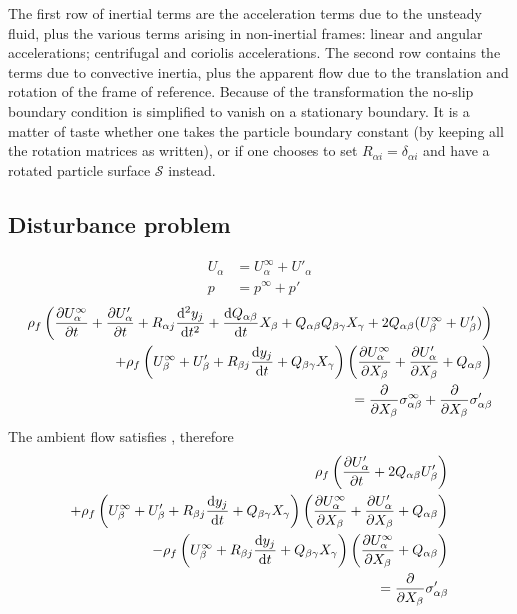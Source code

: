 \documentclass[thesis.tex]{subfiles}
\begin{document}
The first row of inertial terms are the acceleration terms due to the unsteady fluid, plus the various terms arising in non-inertial frames: linear and angular accelerations; centrifugal and coriolis accelerations. The second row contains the terms due to convective inertia, plus the apparent flow due to the translation and rotation of the frame of reference. Because of the transformation the no-slip boundary condition is simplified to vanish on a stationary boundary. It is a matter of taste whether one takes the particle boundary constant (by keeping all the rotation matrices as written), or if one chooses to set $R_{\alpha i} = \delta_{\alpha i}$ and have a rotated particle surface $\mathcal S$ instead.
\subsection{Disturbance problem}
\begin{align}
	U_\alpha &= U^\infty_\alpha + U'_\alpha \\
	p &= p^\infty + p'
\end{align}
\begin{align}
	\rho_f \left(\frac{\partial U^\infty_\alpha}{\partial t}+\frac{\partial U'_\alpha}{\partial t} + R_{\alpha j}\frac{\mathrm{d}^2y_j}{\mathrm{d} t^2} + \frac{\mathrm{d} Q_{\alpha \beta}}{\mathrm{d} t}X_\beta + Q_{\alpha \beta}Q_{\beta \gamma}X_\gamma + 2Q_{\alpha \beta}(U^\infty_\beta+U'_\beta) \right) \nonumber \\
	+ \rho_f \left(U^\infty_\beta + U'_\beta + R_{\beta j}\frac{\mathrm{d} y_j}{\mathrm{d} t}+Q_{\beta \gamma}X_\gamma\right)\left(\frac{\partial U^\infty_\alpha}{\partial X_\beta}+\frac{\partial U'_\alpha}{\partial X_\beta}+Q_{\alpha \beta}\right) \nonumber \\
	= \frac{\partial }{\partial X_\beta} \sigma^\infty_{\alpha \beta} + \frac{\partial }{\partial X_\beta} \sigma'_{\alpha \beta}
\end{align}
The ambient flow satisfies , therefore
\begin{align}
    \rho_f \left(\frac{\partial U'_\alpha}{\partial t} + 2Q_{\alpha \beta}U'_\beta \right) \nonumber \\
    + \rho_f \left(U^\infty_\beta + U'_\beta + R_{\beta j}\frac{\mathrm{d} y_j}{\mathrm{d} t}+Q_{\beta \gamma}X_\gamma\right)\left(\frac{\partial U^\infty_\alpha}{\partial X_\beta}+\frac{\partial U'_\alpha}{\partial X_\beta}+Q_{\alpha \beta}\right) \nonumber \\
-     \rho_f \left(U^\infty_\beta + R_{\beta j}\frac{\mathrm{d} y_j}{\mathrm{d} t}+Q_{\beta \gamma}X_\gamma\right)\left(\frac{\partial U^\infty_\alpha}{\partial X_\beta}+Q_{\alpha \beta}\right) \nonumber \\
    = \frac{\partial }{\partial X_\beta} \sigma'_{\alpha \beta}
\end{align}
\end{document}
